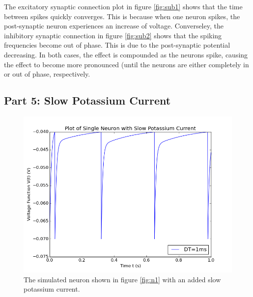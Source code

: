 \documentclass[a4paper, 10pt]{article}
\begin{document}
\vspace{5mm}
The excitatory synaptic connection plot in figure \ref{fig:sub1} shows that the time between spikes quickly converges. This is because when one neuron spikes, the post-synaptic neuron experiences an increase of voltage. Converseley, the inhibitory synaptic connection in figure \ref{fig:sub2} shows that the spiking frequencies become out of phase. This is due to the post-synaptic potential decreasing. In both cases, the effect is compounded as the neurons spike, causing the effect to become more pronounced (until the neurons are either completely in or out of phase, respectively.

\subsection*{Part 5: Slow Potassium Current}
\begin{figure}[H]
  \centering
  \includegraphics[scale=0.4]{p5.png}
  \caption{The simulated neuron shown in figure \ref{fig:n1} with an added slow potassium current.}
\end{figure}
\end{document}
